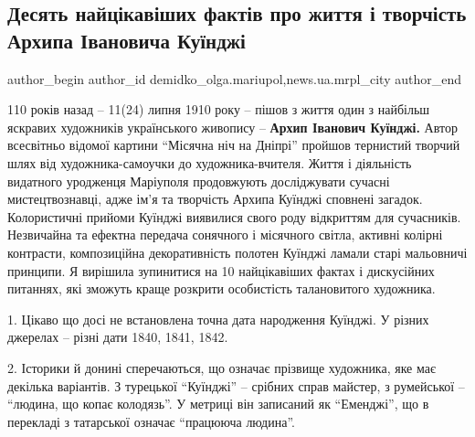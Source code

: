  
 
 
 
 
 
\subsection{Десять найцікавіших фактів про життя і творчість Архипа Івановича Куїнджі}
\label{sec:16_07_2020.stz.news.ua.mrpl_city.1.10_faktiv_kuindzhi}
 
\ifcmt
 author_begin
   author_id demidko_olga.mariupol,news.ua.mrpl_city
 author_end
\fi

110 років назад – 11(24) липня 1910 року – пішов з життя один з найбільш
яскравих художників українського живопису – \textbf{Архип Іванович Куїнджі.} Автор
всесвітньо відомої картини \enquote{Місячна ніч на Дніпрі} пройшов тернистий творчий
шлях від художника-самоучки до художника-вчителя. Життя і діяльність видатного
уродженця Маріуполя продовжують досліджувати сучасні мистецтвознавці, адже ім’я
та творчість Архипа Куїнджі сповнені загадок. Колористичні прийоми Куїнджі
виявилися свого роду відкриттям для сучасників. Незвичайна та ефектна передача
сонячного і місячного світла, активні колірні контрасти, композиційна
декоративність полотен Куїнджі ламали старі мальовничі принципи. Я вирішила
зупинитися на 10 найцікавіших фактах і дискусійних питаннях, які зможуть краще
розкрити особистість талановитого художника.

1. Цікаво що досі не встановлена точна дата народження Куїнджі. У різних
джерелах – різні дати 1840, 1841, 1842.

2. Історики й донині сперечаються, що означає прізвище художника, яке має
декілька варіантів. З турецької \enquote{Куїнджі} – срібних справ майстер, з румейської
– \enquote{людина, що копає колодязь}. У метриці він записаний як \enquote{Еменджі}, що в
перекладі з татарської означає \enquote{працююча людина}.

